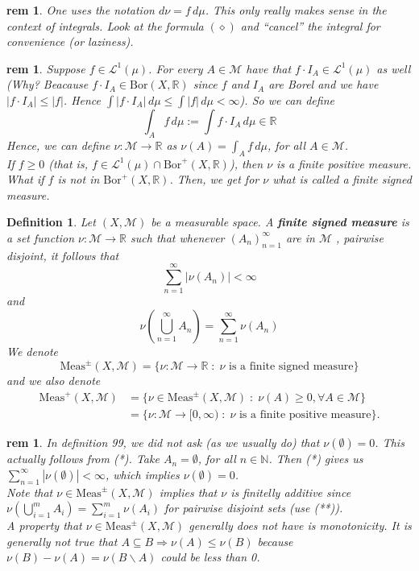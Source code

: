 \documentclass[letterpaper, 12pt]{article}
\newcommand{\st}{\; : \; }
\newcommand{\fin}{\qquad \quad \hfill \framebox[1.75mm][l]{\,}}
\newcommand{\cL}{\mathcal{L}}
\newcommand{\cM}{\mathcal{M}}
\newcommand{\bR}{\mathbb{R}}
\newcommand{\bN}{\mathbb{N}}
\newcommand{\Meas}{\mathrm{Meas}}
\newcommand{\Bor}{\mathrm{Bor}}
\providecommand{\abs}[1]{\left\lvert#1\right\rvert}
\providecommand{\mbrac}[1] {\left( #1 \right)}
\theoremstyle{stdthm}
\theoremstyle{stddef}
\newtheorem{defn}[thm]{Definition}
\newtheorem{rem}[thm]{rem} %
\theoremstyle{stdnonum}
\theoremstyle{stdqands}
\theoremstyle{stdbold}
\begin{document}
\begin{rem}
One uses the notation $d\nu = f \, d\mu$. This only really makes sense in the context of integrals. Look at the formula $(\diamond)$ and ``cancel'' the integral for convenience (or laziness). 
\end{rem}

\begin{rem}
Suppose $f \in \cL^1(\mu)$. For every $A \in \cM$ have that $f \cdot I_A \in \cL^1(\mu)$ as well (Why? Beacause $f \cdot I_A \in \Bor(X,\bR)$ since $f$ and $I_A$ are Borel and we have $|f \cdot I_A| \leq |f|$. Hence $\int |f \cdot I_A| \, d\mu \leq  \int |f| \, d\mu < \infty$). So we can define 
\[ \int_A f \,d\mu := \int f \cdot I_A \,d\mu \in \bR \]
Hence, we can define $\nu: \cM \rightarrow \bR$ as $\nu(A) = \int_A f \,d\mu$, for all $A \in \cM$. \\

\noindent If $f \geq 0$ (that is, $f \in \cL^1(\mu) \cap \Bor^+(X,\bR)$), then $\nu$ is a finite positive measure. What if $ f$ is not in $\Bor^+(X,\bR)$. Then, we get for $\nu$ what is called a finite signed measure. 
\end{rem}

\begin{defn}
Let $(X,\cM)$ be a measurable space. A {\bf finite signed measure } is a set function $\nu: \cM \rightarrow \bR$ such that whenever $(A_n)_{n=1}^\infty$ are in $\cM$ , pairwise disjoint, it follows that 
\[
\sum_{n=1}^\infty \abs{\nu(A_n)} < \infty \tag{*}
\]
and
\[
\nu \mbrac{\bigcup_{n=1}^\infty A_n } = \sum_{n=1}^\infty \nu(A_n) \tag{**}
\] 
We denote 
\[ \Meas^{\pm} (X,\cM) = \{ \nu: \cM \rightarrow \bR \st \nu \mbox{ is a finite signed measure}\} \] 
and we also denote
\begin{align*}
\Meas^+(X,\cM)& = \{ \nu \in \Meas^{\pm}(X,\cM) \st \nu(A) \geq 0, \forall A \in \cM \}\\
&= \{ \nu: \cM \rightarrow [0,\infty) \st \nu \mbox{ is a finite positive measure}\}.
\end{align*}
\end{defn}

\begin{rem}
In definition 99, we did not ask (as we usually do) that $\nu(\emptyset) =0$. This actually follows from (*). Take $A_n = \emptyset$, for all $n \in \bN$. Then (*) gives us $\sum_{n=1}^\infty \abs{\nu(\emptyset)} < \infty$, which implies $\nu(\emptyset) = 0$. \\

\noindent Note that $\nu \in \Meas^{\pm}(X,\cM)$ implies that $\nu$ is finitelly additive since $\nu(\bigcup_{i=1}^m A_i) = \sum_{i=1}^m \nu(A_i)$ for pairwise disjoint sets (use (**)).\\

  A property that $\nu \in \Meas^{\pm}(X,\cM)$ generally does not have is monotonicity. It is generally not true that $A\subseteq B \Rightarrow \nu(A) \leq \nu(B)$ because $\nu(B) - \nu(A) = \nu(B\backslash A)$ could be less than 0. 
\end{rem}
\end{document}

